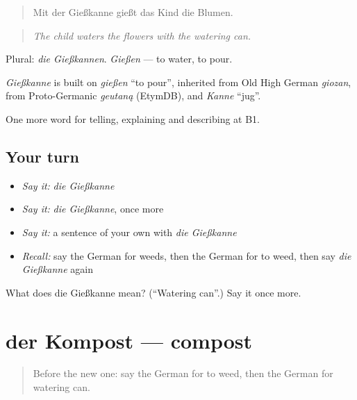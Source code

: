 \begin{quote}
Mit der Gießkanne gießt das Kind die Blumen.
\end{quote}

\begin{quote}
\emph{The child waters the flowers with the watering can.}
\end{quote}

Plural: \emph{die Gießkannen}. \emph{Gießen} — to water, to pour.

\begin{cousinweb}
\emph{Gießkanne} is built on \emph{gießen} \textquotedblleft{}to pour\textquotedblright{}, inherited from Old High German \emph{giozan}, from Proto-Germanic \emph{geutaną} (EtymDB), and \emph{Kanne} \textquotedblleft{}jug\textquotedblright{}.
\end{cousinweb}

\begin{grammarlens}[title={What you've built}]
One more word for telling, explaining and describing at B1.
\end{grammarlens}

\subsection*{Your turn}
\begin{itemize}
\raggedright
  \item \emph{Say it:} \emph{die Gießkanne}
  \item \emph{Say it:} \emph{die Gießkanne}, once more
  \item \emph{Say it:} a sentence of your own with \emph{die Gießkanne}
  \item \emph{Recall:} say the German for weeds, then the German for to weed, then say \emph{die Gießkanne} again
\end{itemize}

\begin{tcolorbox}[breakable,colback=teal!4,colframe=teal!35!black,title={Before you move on}]
What does die Gießkanne mean? (\textquotedblleft{}Watering can\textquotedblright{}.) Say it once more.
\end{tcolorbox}
\section[der Kompost]{der Kompost — compost}

\label{lesson:GE-C503-kompost}



\begin{quote}
Before the new one: say the German for to weed, then the German for watering can.
\end{quote}

